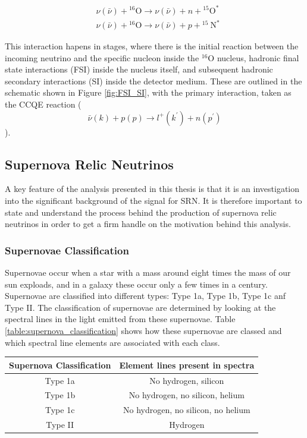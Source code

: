 \begin{align}
&\nu(\bar{\nu})+{ }^{16} \mathrm{O} \rightarrow \nu(\bar{\nu})+n+{ }^{15} \mathrm{O}^{*} \label{eq:nu_nucleon} \\
&\nu(\bar{\nu})+{ }^{16} \mathrm{O} \rightarrow \nu(\bar{\nu})+p+{ }^{15} \mathrm{~N}^{*}
\end{align}


This interaction hapens in stages, where there is the initial reaction between the incoming neutrino and the specific nucleon inside the ${ }^{16} \mathrm{O}$ nucleus, hadronic final state interactions (FSI) inside the nucleus itself, and subsequent hadronic secondary interactions (SI) inside the detector medium. These are outlined in the schematic shown in Figure \ref{fig:FSI_SI}, with the primary interaction, taken as the CCQE reaction ($$\bar{\nu}(k)+p(p) \rightarrow l^{+}\left(k^{\prime}\right)+n\left(p^{\prime}\right)$$).









\subsection{Supernova Relic Neutrinos}

A key feature of the analysis presented in this thesis is that it is an investigation into the significant background of the signal for SRN. It is therefore important to state and understand the process behind the production of supernova relic neutrinos in order to get a firm handle on the motivation behind this analysis. 

\subsubsection{Supernovae Classification}
Supernovae occur when a star with a mass around eight times the mass of our sun exploads, and in a galaxy these occur only a few times in a century. Supernovae are classified into different types: Type 1a, Type 1b, Type 1c anf Type II. The classification of supernovae are determined by looking at the spectral lines in the light emitted from these supernovae. Table \ref{table:supernova_classification} shows how these supernovae are classed and which spectral line elements are associated with each class. 

\begin{center}
\begin{tabular}{||c c||} 
    \hline
    Supernova Classification & Element lines present in spectra \\ 
    \hline \hline
    Type 1a & No hydrogen, silicon  \\ 
    \hline
    Type 1b & No hydrogen, no silicon, helium  \\
    \hline
    Type 1c & No hydrogen, no silicon, no helium  \\
    \hline
    Type II & Hydrogen  \\
    \hline \hline
\end{tabular}
\label{table:supernova_classification}
\end{center}

